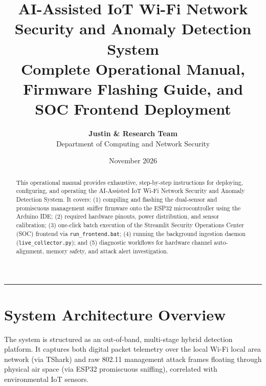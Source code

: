 \documentclass[11pt,a4paper]{article}
\title{\vspace{-1.5cm}\textbf{\LARGE AI-Assisted IoT Wi-Fi Network Security and Anomaly Detection System}\\[0.4cm]
\Large Complete Operational Manual, Firmware Flashing Guide, and SOC Frontend Deployment}
\author{\textbf{Justin \& Research Team} \\ Department of Computing and Network Security}
\date{November 2026}
\begin{document}
\maketitle
\thispagestyle{empty}

\begin{abstract}
This operational manual provides exhaustive, step-by-step instructions for deploying, configuring, and operating the AI-Assisted IoT Wi-Fi Network Security and Anomaly Detection System. It covers: (1) compiling and flashing the dual-sensor and promiscuous management sniffer firmware onto the ESP32 microcontroller using the Arduino IDE; (2) required hardware pinouts, power distribution, and sensor calibration; (3) one-click batch execution of the Streamlit Security Operations Center (SOC) frontend via \texttt{run\_frontend.bat}; (4) running the background ingestion daemon (\texttt{live\_collector.py}); and (5) diagnostic workflows for hardware channel auto-alignment, memory safety, and attack alert investigation.
\end{abstract}

\vspace{0.3cm}
\tableofcontents
\vspace{0.5cm}
\hrule
\vspace{0.5cm}

\section{System Architecture Overview}

The system is structured as an out-of-band, multi-stage hybrid detection platform. It captures both digital packet telemetry over the local Wi-Fi local area network (via TShark) and raw 802.11 management attack frames floating through physical air space (via ESP32 promiscuous sniffing), correlated with environmental IoT sensors.
\end{document}
